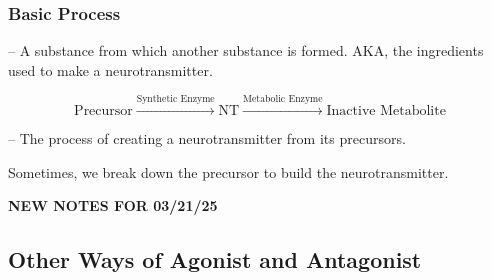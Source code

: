 \subsubsection{Basic Process}

\begin{coloredlist}
    \item {} -- A substance from which another substance is formed. AKA, the ingredients used to make a neurotransmitter.
    \item \[
        \text{Precursor} \xrightarrow{\text{Synthetic Enzyme}} \text{NT} \xrightarrow{\text{Metabolic Enzyme}} \text{Inactive Metabolite}
    \]
    \begin{coloredlist}
        \item {} -- The process of creating a neurotransmitter from its precursors.
        \item Sometimes, we break down the precursor to build the neurotransmitter.
    \end{coloredlist}
\end{coloredlist}

\begin{center}
    \textbf{NEW NOTES FOR 03/21/25} \\
    \hrulefill
\end{center}

\subsection{Other Ways of Agonist and Antagonist}

